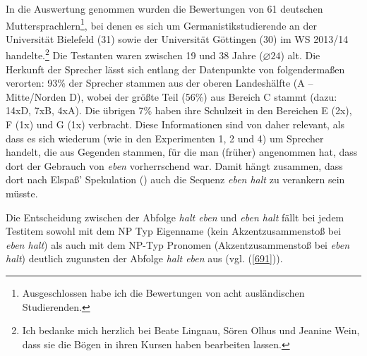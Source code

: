 In die Auswertung genommen wurden die Bewertungen von 61 deutschen Muttersprachlern\footnote{Ausgeschlossen habe ich die Bewertungen von acht ausländischen Studierenden.}, bei denen es sich um Germanistikstudierende an der Universität Bielefeld (31) sowie der Universität Göttingen (30) im WS 2013/14 handelte.\footnote{Ich bedanke mich herzlich bei Beate Lingnau, Sören Olhus und Jeanine Wein, dass sie die Bögen in ihren Kursen haben bearbeiten lassen.} Die Testanten waren zwischen 19 und 38 Jahre ($\diameter 24$) alt. Die Herkunft der Sprecher lässt sich entlang der Datenpunkte von \citet{Eichhoff1978} folgendermaßen verorten: 93\% der Sprecher stammen aus der oberen Landeshälfte (A – Mitte/Norden D), wobei der größte Teil (56\%) aus Bereich C stammt (dazu: 14xD, 7xB, 4xA). Die übrigen 7\% haben ihre Schulzeit in den Bereichen E (2x), F (1x) und G (1x) verbracht. Diese Informationen sind von daher relevant, als dass es sich wiederum (wie in den Experimenten 1, 2 und 4) um Sprecher handelt, die aus Gegenden stammen, für die man (früher) angenommen hat, dass dort der Gebrauch von \textit{eben} vorherrschend war. Damit hängt zusammen, dass dort nach Elspaß' Spekulation (\citeyear[17, Fn 41]{Elspass2005}) auch die Sequenz \textit{eben halt} zu verankern sein müsste.

Die Entscheidung zwischen der Abfolge \textit{halt eben} und \textit{eben halt} fällt bei jedem Testitem sowohl mit dem NP Typ \glq Eigenname\grq {} (kein Akzentzusammenstoß bei \textit{eben halt}) als auch mit dem NP-Typ \glq Pronomen\grq {}  (Akzentzusammenstoß bei \textit{eben halt}) deutlich zugunsten der Abfolge \textit{halt eben} aus (vgl. (\ref{691})).


